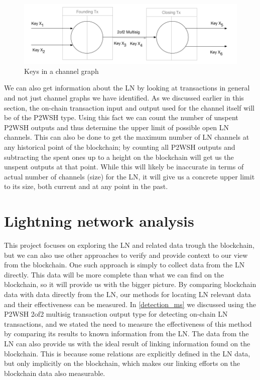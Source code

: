 \begin{figure}[h]
    \centering
    \includegraphics[width=14cm]{figures/keys_subgraph.png}
    \caption{Keys in a channel graph}
    \label{fig:keys_graphs}
\end{figure}

We can also get information about the LN by looking at transactions in general and not just channel graphs we have identified.
As we discussed earlier in this section, the on-chain transaction input and output used for the channel itself will be of the P2WSH type. Using this fact we can count the number of unspent P2WSH outputs and thus determine the upper limit of possible open LN channels. 
This can also be done to get the maximum number of LN channels at any historical point of the blockchain; by counting all P2WSH outputs and subtracting the spent ones up to a height on the blockchain will get us the unspent outputs at that point. While this will likely be inaccurate in terms of actual number of channels (size) for the LN, it will give us a concrete upper limit to its size, both current and at any point in the past.


\section{Lightning network analysis}
\label{sec:ln_analysis}

This project focuses on exploring the LN and related data trough the blockchain, but we can also use other approaches to verify and provide context to our view from the blockchain. One such approach is simply to collect data from the LN directly. This data will be more complete than what we can find on the blockchain, so it will provide us with the bigger picture. By comparing blockchain data with data directly from the LN, our methods for locating LN relevant data and their effectiveness can be measured. In \cref{detection_ms} we discussed using the P2WSH 2of2 multisig transaction output type for detecting on-chain LN transactions, and we stated the need to measure the effectiveness of this method by comparing its results to known information from the LN. The data from the LN can also provide us with the ideal result of linking information found on the blockchain. This is because some relations are explicitly defined in the LN data, but only implicitly on the blockchain, which makes our linking efforts on the blockchain data also measurable.
\\

